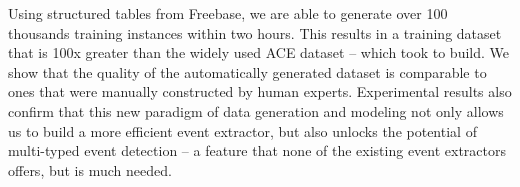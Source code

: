 Using  structured tables from Freebase, we are able to generate over 100 thousands training instances within two hours. This
results in a training dataset that is 100x greater than the widely used ACE dataset -- which took  to
build\FIXME{~\cite{}}. We show that the quality of the automatically generated dataset is comparable to ones that were manually constructed
by human experts. Experimental results also confirm that this new paradigm of data generation and modeling not only allows us to build a
more efficient event extractor, but also unlocks the potential of multi-typed event detection -- a feature that none of the existing event
extractors offers, but is much needed.








